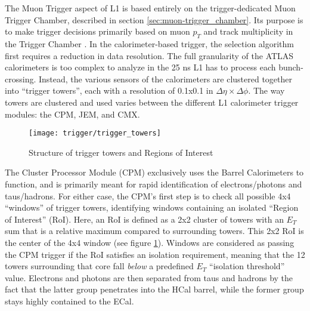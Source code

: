         The Muon Trigger aspect of L1 is based entirely on the trigger-dedicated Muon Trigger Chamber, described in section \ref{sec:muon-trigger_chamber}.
        Its purpose is to make trigger decisions primarily based on muon $p_T$ and track multiplicity in the Trigger Chamber \cite{trigger_run1}.
        In the calorimeter-based trigger, the selection algorithm first requires a reduction in data resolution.
        The full granularity of the ATLAS calorimeters is too complex to analyze in the 25 ns L1 has to process each bunch-crossing.
        Instead, the various sensors of the calorimeters are clustered together into ``trigger towers'', each with a resolution of 0.1x0.1 in $\Delta \eta \times \Delta \phi$.
        The way towers are clustered and used varies between the different L1 calorimeter trigger modules: the CPM, JEM, and CMX.

        \begin{figure}[h]
            \texttt{[image: trigger/trigger\_towers]}
            \caption{Structure of trigger towers and Regions of Interest \cite{L1_calo_run1}}
            \label{fig:trigger_towers}
        \end{figure}


        The Cluster Processor Module (CPM) exclusively uses the Barrel Calorimeters to function, and is primarily meant for rapid identification of electrons/photons and taus/hadrons.
        For either case, the CPM's first step is to check all possible 4x4 ``windows'' of trigger towers, identifying windows containing an isolated ``Region of Interest'' (RoI).
        Here, an RoI is defined as a 2x2 cluster of towers with an $E_T$ sum that is a relative maximum compared to surrounding towers.
        This 2x2 RoI is the center of the 4x4 window (see figure \ref{fig:trigger_towers}).
        Windows are considered as passing the CPM trigger if the RoI satisfies an isolation requirement, meaning that the 12 towers surrounding that core fall \textit{below} a predefined $E_T$ ``isolation threshold'' value.
        Electrons and photons are then separated from taus and hadrons by the fact that the latter group penetrates into the HCal barrel, while the former group stays highly contained to the ECal.

